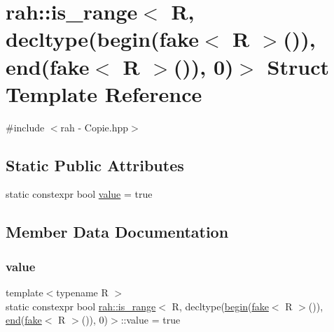 \hypertarget{structrah_1_1is__range_3_01_r_00_01decltype_07begin_07fake_3_01_r_01_4_07_08_08_00_01end_07fake_cf1a9a1e2579209cb82001bc9eda23c1}{}\section{rah\+::is\+\_\+range$<$ R, decltype(begin(fake$<$ R $>$()), end(fake$<$ R $>$()), 0)$>$ Struct Template Reference}
\label{structrah_1_1is__range_3_01_r_00_01decltype_07begin_07fake_3_01_r_01_4_07_08_08_00_01end_07fake_cf1a9a1e2579209cb82001bc9eda23c1}


{\ttfamily \#include $<$rah -\/ Copie.\+hpp$>$}

\subsection*{Static Public Attributes}
\begin{DoxyCompactItemize}
\item 
static constexpr bool \mbox{\hyperlink{structrah_1_1is__range_3_01_r_00_01decltype_07begin_07fake_3_01_r_01_4_07_08_08_00_01end_07fake_cf1a9a1e2579209cb82001bc9eda23c1_aea9f956293b799924d96ab46f06f9569}{value}} = true
\end{DoxyCompactItemize}


\subsection{Member Data Documentation}
\mbox{\label{structrah_1_1is__range_3_01_r_00_01decltype_07begin_07fake_3_01_r_01_4_07_08_08_00_01end_07fake_cf1a9a1e2579209cb82001bc9eda23c1_aea9f956293b799924d96ab46f06f9569}} 
\subsubsection{\texorpdfstring{value}{value}}
{\footnotesize\ttfamily template$<$typename R $>$ \\
static constexpr bool \mbox{\hyperlink{structrah_1_1is__range}{rah\+::is\+\_\+range}}$<$ R, decltype(\mbox{\hyperlink{namespacerah_a2c4a19e57cc4e0753e93830f247def6d}{begin}}(\mbox{\hyperlink{namespacerah_aa659f5ae02cb923cd8813f96cfd86a25}{fake}}$<$ R $>$()), \mbox{\hyperlink{namespacerah_aaddd1442cd76b96876e692cdefe7261d}{end}}(\mbox{\hyperlink{namespacerah_aa659f5ae02cb923cd8813f96cfd86a25}{fake}}$<$ R $>$()), 0)$>$\+::value = true\hspace{0.3cm}{\ttfamily [static]}}



